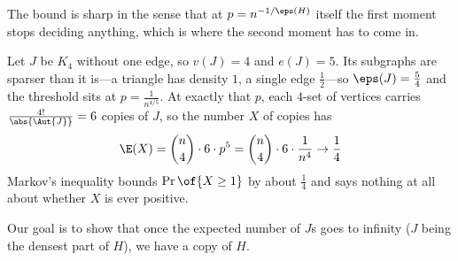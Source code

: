 The bound is sharp in the sense that at $p = n^{-1/\eps(H)}$ itself the first moment stops deciding anything, which is where the second moment has to come in.

\begin{boxexample}
    Let $J$ be $K_4$ without one edge, so $v(J) = 4$ and $e(J) = 5$. Its subgraphs are sparser than it is---a triangle has density $1$, a single edge $\frac{1}{2}$---so $\eps(J) = \frac{5}{4}$ and the threshold sits at $p = \frac{1}{n^{4/5}}$. At exactly that $p$, each $4$-set of vertices carries $\frac{4!}{\abs{\Aut{J}}} = 6$ copies of $J$, so the number $X$ of copies has
    \begin{align*}
        \E(X) = \binom{n}{4} \cdot 6 \cdot p^5 = \binom{n}{4} \cdot 6 \cdot \frac{1}{n^4} \to \frac{1}{4}
    \end{align*}
    Markov's inequality bounds $\Pr\of{X \geq 1}$ by about $\frac{1}{4}$ and says nothing at all about whether $X$ is ever positive.
\end{boxexample}

Our goal is to show that once the expected number of $J$s goes to infinity ($J$ being the densest part of $H$), we have a copy of $H$.
